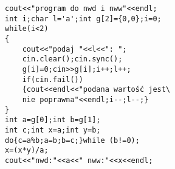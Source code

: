 \begin{verbatim}
cout<<"program do nwd i nww"<<endl;    
int i;char l='a';int g[2]={0,0};i=0;
while(i<2)
{
    cout<<"podaj "<<l<<": ";
    cin.clear();cin.sync();
    g[i]=0;cin>>g[i];i++;l++;
    if(cin.fail())
    {cout<<endl<<"podana wartość jest\
    nie poprawna"<<endl;i--;l--;}
}
int a=g[0];int b=g[1];
int c;int x=a;int y=b;
do{c=a%b;a=b;b=c;}while (b!=0);
x=(x*y)/a;    
cout<<"nwd:"<<a<<" nww:"<<x<<endl;
\end{verbatim}